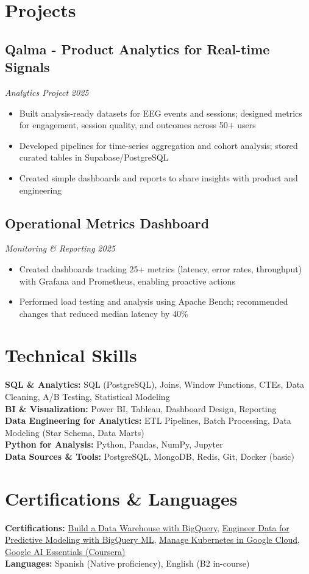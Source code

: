 \documentclass[7.5pt,a4paper]{article}
\newcommand{\project}[3]{\subsection*{#1}\textit{#2} \hfill \textit{#3}}
\begin{document}
\section*{Projects}

\project{Qalma - Product Analytics for Real-time Signals}{Analytics Project}{2025}
\begin{itemize}
\item Built analysis-ready datasets for EEG events and sessions; designed metrics for engagement, session quality, and outcomes across 50+ users
\item Developed pipelines for time-series aggregation and cohort analysis; stored curated tables in Supabase/PostgreSQL
\item Created simple dashboards and reports to share insights with product and engineering
\end{itemize}

\project{Operational Metrics Dashboard}{Monitoring \& Reporting}{2025}
\begin{itemize}
\item Created dashboards tracking 25+ metrics (latency, error rates, throughput) with Grafana and Prometheus, enabling proactive actions
\item Performed load testing and analysis using Apache Bench; recommended changes that reduced median latency by 40\%
\end{itemize}

\section*{Technical Skills}
\textbf{SQL \& Analytics:} SQL (PostgreSQL), Joins, Window Functions, CTEs, Data Cleaning, A/B Testing, Statistical Modeling \\
\textbf{BI \& Visualization:} Power BI, Tableau, Dashboard Design, Reporting \\
\textbf{Data Engineering for Analytics:} ETL Pipelines, Batch Processing, Data Modeling (Star Schema, Data Marts) \\
\textbf{Python for Analysis:} Python, Pandas, NumPy, Jupyter \\
\textbf{Data Sources \& Tools:} PostgreSQL, MongoDB, Redis, Git, Docker (basic)

\section*{Certifications \& Languages}
\textbf{Certifications:} \href{https://www.credly.com/badges/c41430a1-de6e-4642-86e2-0d55dad94f18/public_url}{Build a Data Warehouse with BigQuery}, \href{https://www.credly.com/badges/18b87ad4-da02-4a37-a92e-f8e60fa53559/public_url}{Engineer Data for Predictive Modeling with BigQuery ML}, \href{https://www.credly.com/badges/5e7db262-4e11-41d3-8630-2b8c9c3458e3/public_url}{Manage Kubernetes in Google Cloud}, \href{https://www.credly.com/badges/1e3dfdbc-ec96-4e7c-a6e6-351eefae2390/public_url}{Google AI Essentials (Coursera)} \\
\textbf{Languages:} Spanish (Native proficiency), English (B2 in-course)
\end{document}
